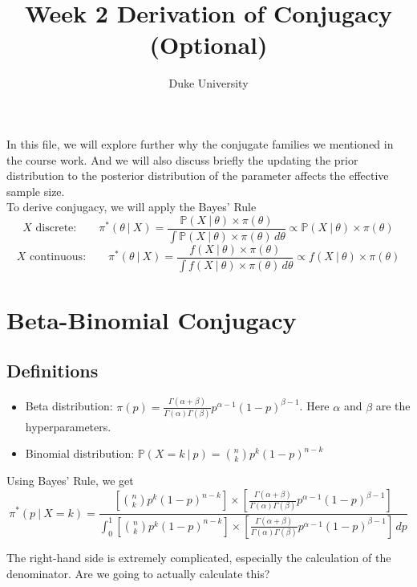 \documentclass{article}
\def\dsst{\displaystyle}
\begin{document}
\title{Week 2 Derivation of Conjugacy (Optional)}
\author{Duke University}
\date{}
\maketitle 

In this file, we will explore further why the conjugate families we mentioned in the course work. And we will also discuss briefly the updating the prior distribution to the posterior distribution of the parameter affects the effective sample size.\\

To derive conjugacy, we will apply the Bayes' Rule
$$ X \text{ discrete:}\qquad \pi^*(\theta ~|~X) = \frac{\mathbb{P}(X~|~\theta)\times \pi(\theta)}{\dsst \int \mathbb{P}(X~|~\theta)\times \pi(\theta)\, d\theta} \propto \mathbb{P}(X~|~\theta)\times \pi(\theta) $$
$$ X \text{ continuous:}\qquad \pi^*(\theta ~|~X) = \frac{f(X~|~\theta)\times \pi(\theta)}{\dsst \int f(X~|~\theta)\times \pi(\theta)\, d\theta} \propto f(X~|~\theta)\times \pi(\theta) $$

\section{Beta-Binomial Conjugacy}

\subsection{Definitions}
\begin{itemize}
	\item Beta distribution: $\pi(p) = \dsst \frac{\Gamma(\alpha+\beta)}{\Gamma(\alpha)\Gamma(\beta)}p^{\alpha-1}(1-p)^{\beta-1}$. Here $\alpha$ and $\beta$ are the hyperparameters.
	
	\item Binomial distribution: $\mathbb{P}(X=k~|~p) =\dsst \binom{n}{k}p^k(1-p)^{n-k}$
\end{itemize}

Using Bayes' Rule, we get
$$ \pi^*(p~|~X=k) = \frac{\dsst \left[\binom{n}{k}p^k(1-p)^{n-k}\right]\times \left[\frac{\Gamma(\alpha+\beta)}{\Gamma(\alpha)\Gamma(\beta)}p^{\alpha-1}(1-p)^{\beta-1}\right]}{\dsst \int_0^1  \left[\binom{n}{k}p^k(1-p)^{n-k}\right]\times \left[\frac{\Gamma(\alpha+\beta)}{\Gamma(\alpha)\Gamma(\beta)}p^{\alpha-1}(1-p)^{\beta-1}\right]\, dp} $$

The right-hand side is extremely complicated, especially the calculation of the denominator. Are we going to actually calculate this?\\
\end{document}
